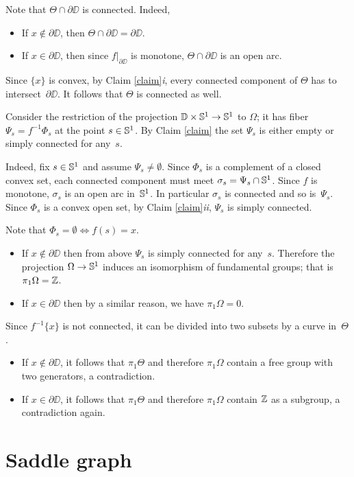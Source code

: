 \documentclass{article}
\begin{document}
Note that $\Theta\cap \partial\DD$ is connected.
Indeed,
\begin{itemize}
\item If $x\notin \partial\DD$, then $\Theta\cap \partial\DD=\partial \DD$. 
\item If $x\in \partial\DD$, then since $f|_{\partial\DD}$ is monotone, $\Theta\cap \partial\DD$ is an open arc.
\end{itemize}
Since $\{x\}$ is convex, by Claim \ref{claim}\textit{i}, every connected component of $\Theta$ has to intersect~$\partial\DD$.
It follows that $\Theta$ is connected as well.

Consider the restriction of the projection $\mathbb{D}\times\mathbb{S}^1\to \mathbb{S}^1$ to $\Omega$;
it has fiber $\Psi_s=f^{-1}\Phi_s$ at the point $s\in\mathbb{S}^1$.
By Claim \ref{claim} the set $\Psi_s$ is either empty or simply connected for any~$s$.

Indeed, fix $s\in\mathbb{S}^1$ and assume $\Psi_s\ne \emptyset$.
Since $\Phi_s$ is a complement of a closed convex set,
each connected component must meet $\sigma_s=\Psi_s\cap\mathbb{S}^1$.
Since $f$ is monotone, $\sigma_s$ is an open arc in~$\mathbb{S}^1$.
In particular $\sigma_s$ is connected and so is~$\Psi_s$.
Since $\Phi_s$ is a convex open set, by Claim \ref{claim}\textit{ii}, $\Psi_s$ is simply connected.

Note that $\Phi_s=\emptyset\iff f(s)=x$.
\begin{itemize}
\item If $x\notin\partial\DD$ then from above $\Psi_s$ is simply connected for any~$s$.
Therefore the projection $\Omega\to \mathbb{S}^1$ induces an isomorphism of fundamental groups; that is $\pi_1\Omega=\mathbb{Z}$.
\item If $x\in\partial\DD$ then by a similar reason, we have $\pi_1\Omega=0$.
\end{itemize}

Since $f^{-1}\{x\}$ is not connected, it can be divided into two subsets by a curve in~$\Theta$.
\begin{itemize}
\item If $x\notin\partial \DD$, it follows that $\pi_1\Theta$ and therefore $\pi_1\Omega$ contain a free group with two generators, a contradiction.
\item If $x\in\partial\DD$, it follows that $\pi_1\Theta$ and therefore $\pi_1\Omega$ contain $\mathbb{Z}$ as a subgroup, a contradiction again.\qeds
\end{itemize}

\section{Saddle graph}
\end{document}
